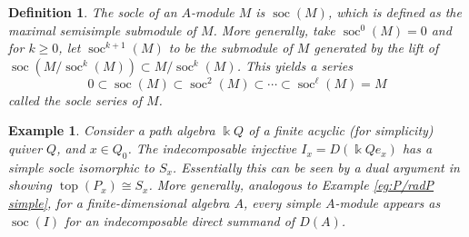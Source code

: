 \documentclass[11pt,a4paper]{article}
\numberwithin{equation}{section}
\theoremstyle{all}
\newtheorem{lemma}[theorem]{Lemma}
\newtheorem{example}[theorem]{Example}
\newtheorem{definition}[theorem]{Definition}
\theoremstyle{remark}
\newcommand{\soc}{\operatorname{soc}\nolimits}
\renewcommand{\top}{\operatorname{top}\nolimits}
\DeclareMathOperator{\inj}{\mathsf{inj}}
\newcommand{\defn}[1]{\textsl{\color{darkblue} #1}}
\begin{document}
\begin{definition}
The \defn{socle} of an $A$-module $M$ is $\soc(M)$, which is defined as the maximal semisimple submodule of $M$.
More generally, take $\soc^0(M)=0$ and for $k\geq 0$, let $\soc^{k+1}(M)$ to be the submodule of $M$ generated by the lift of $\soc(M/\soc^k(M)) \subset M/\soc^k(M)$.
This yields a series
\[
0\subset \soc(M) \subset \soc^2(M) \subset \cdots \subset \soc^\ell(M)=M
\]
called the \defn{socle series} of $M$.
\end{definition}

\begin{example}
Consider a path algebra $\Bbbk Q$ of a finite acyclic (for simplicity) quiver $Q$, and $x\in Q_0$.  The indecomposable injective $I_x=D(\Bbbk Q e_x)$ has a simple socle isomorphic to $S_x$.  Essentially this can be seen by a dual argument in showing $\top(P_x)\cong S_x$.
More generally, analogous to Example \ref{eg:P/radP simple}, for a finite-dimensional algebra $A$, every simple $A$-module appears as $\soc(I)$ for an indecomposable direct summand of $D(A)$.
\end{example}

%
%
%
%
%
%
\end{document}
